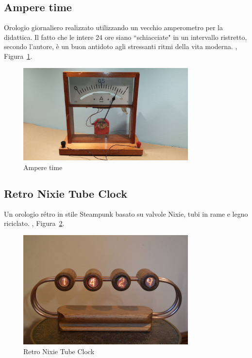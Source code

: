 \documentclass[12pt,a4paper]{report}
\begin{document}
\subsection{Ampere time}
Orologio giornaliero realizzato utilizzando un vecchio amperometro per la didattica. Il fatto che le intere 24 ore siano ``schiacciate"
in un intervallo ristretto, secondo l'autore, è un buon antidoto agli stressanti ritmi della vita moderna.
\cite{amperetime}, Figura~\ref{fig:amperetime}.

\begin{figure}[h]
  \centering
  \includegraphics[width=0.8\textwidth]{amperetime}
  \caption{Ampere time \cite{amperetime}}
  \label{fig:amperetime}
\end{figure}

\subsection{Retro Nixie Tube Clock}
Un orologio rétro in stile Steampunk basato su valvole Nixie, tubi in rame e legno riciclato.
\cite{nixieclock}, Figura~\ref{fig:nixieclock}.

\begin{figure}[h]
  \centering
  \includegraphics[width=0.8\textwidth]{nixieclock}
  \caption{Retro Nixie Tube Clock \cite{nixieclock}}
  \label{fig:nixieclock}
\end{figure}
\end{document}
